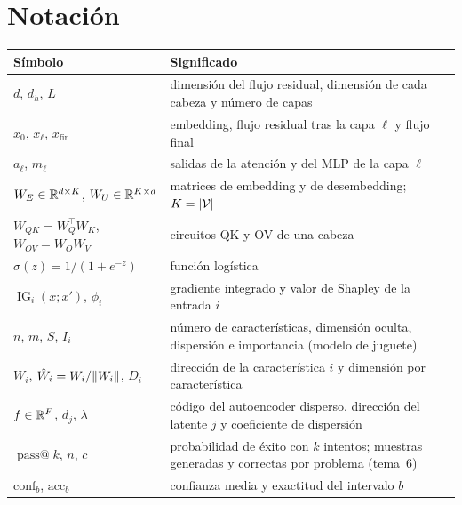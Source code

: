 \documentclass[11pt,a4paper,twoside,openany]{book}
\makeatletter
\newcommand{\T}{^{\top}}
\newcommand{\WU}{W_{U}}
\newcommand{\WE}{W_{E}}
\newcommand{\WOV}{W_{OV}}
\newcommand{\WQK}{W_{QK}}
\newcommand{\IG}{\operatorname{IG}}
\newcommand{\passk}[1]{\operatorname{pass@}#1}
\makeatother
\begin{document}
\section*{Notación}
\begin{center}\small
\begin{tabularx}{\textwidth}{@{}l>{\raggedright\arraybackslash}X@{}}
\toprule
Símbolo & Significado \\
\midrule
$d$, $d_h$, $L$ & dimensión del flujo residual, dimensión de cada cabeza y número de capas \\
$x_0$, $x_\ell$, $x_{\mathrm{fin}}$ & embedding, flujo residual tras la capa $\ell$ y flujo final \\
$a_\ell$, $m_\ell$ & salidas de la atención y del MLP de la capa $\ell$ \\
$\WE\in\R^{d\times K}$, $\WU\in\R^{K\times d}$ & matrices de embedding y de desembedding; $K=\lvert\mathcal{V}\rvert$ \\
$\WQK=W_Q\T W_K$, $\WOV=W_OW_V$ & circuitos QK y OV de una cabeza \\
$\sigma(z)=1/(1+e^{-z})$ & función logística \\
$\IG_i(x;x')$, $\phi_i$ & gradiente integrado y valor de Shapley de la entrada $i$ \\
$n$, $m$, $S$, $I_i$ & número de características, dimensión oculta, dispersión e importancia (modelo de juguete) \\
$W_i$, $\hat W_i=W_i/\lVert W_i\rVert$, $D_i$ & dirección de la característica $i$ y dimensión por característica \\
$f\in\mathbb{R}^{F}$, $d_j$, $\lambda$ & código del autoencoder disperso, dirección del latente $j$ y coeficiente de dispersión \\
$\passk{k}$, $n$, $c$ & probabilidad de éxito con $k$ intentos; muestras generadas y correctas por problema (tema~6) \\
$\mathrm{conf}_b$, $\mathrm{acc}_b$ & confianza media y exactitud del intervalo $b$ \\
\bottomrule
\end{tabularx}
\end{center}


\tableofcontents

\mainmatter







\backmatter

\end{document}

